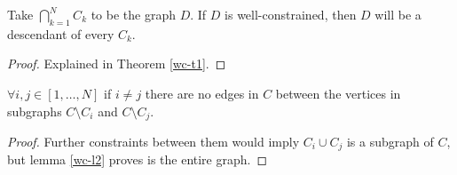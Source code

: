 \begin{corollary}
Take $\bigcap_{k=1}^N{C_k}$ to be the graph $D$. If $D$ is well-constrained, then $D$ will be a descendant of every $C_k$.
\end{corollary}

\begin{proof}
Explained in Theorem \ref{wc-t1}.
\end{proof}

\begin{corollary}
$\forall i,j\in [1,\ldots,N]$ if $i\neq j$ there are no edges in $C$ between the vertices in subgraphs $C\setminus C_i$ and $C\setminus C_j$.
\end{corollary}

\begin{proof}
Further constraints between them would imply $C_i \cup C_j$ is a subgraph of $C$, but lemma \ref{wc-l2} proves is the entire graph.
\end{proof}











